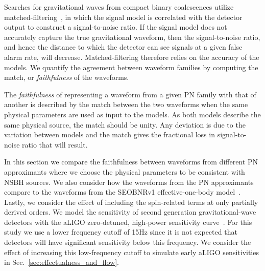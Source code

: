 Searches for gravitational waves from compact binary coalescences utilize
matched-filtering~\cite{Wainstein,Allen:2005fk}, in which the signal model is
correlated with the detector output to construct a signal-to-noise
ratio. If the signal model does not accurately capture the true gravitational
waveform, then the signal-to-noise ratio, and hence the distance to which the
detector can see signals at a given false alarm rate, will decrease. Matched-filtering 
therefore relies on the accuracy of the models. We quantify the 
agreement between waveform families by computing the match, or
\emph{faithfulness} of the waveforms.

The \emph{faithfulness} of representing a waveform from a given \ac{PN} family with
that of another is described by the match between the two waveforms when the
same physical parameters are used as input to the models. As both models
describe the same physical source, the match should be unity. Any deviation is
due to the variation between models and the match gives the fractional loss in
signal-to-noise ratio that will result.

In this section we compare the faithfulness between waveforms from different
\ac{PN} approximants where we choose the physical parameters to be consistent
with \ac{NSBH} sources.  We also consider how the waveforms from the \ac{PN}
approximants compare to the waveforms from the SEOBNRv1 effective-one-body
model~\cite{Taracchini:2012ig}. Lastly, we consider the effect of including 
the spin-related terms at only partially derived orders. 
We model the sensitivity of second generation  gravitational-wave detectors with the aLIGO
zero-detuned, high-power sensitivity curve~\cite{aLIGOSensCurves}. For this
study we use a lower frequency cutoff of 15Hz since it is not expected that
detectors will have significant sensitivity below this frequency. We consider
the effect of increasing this low-frequency cutoff to simulate early aLIGO
sensitivities in Sec.~\ref{sec:effectualness_and_flow}.

